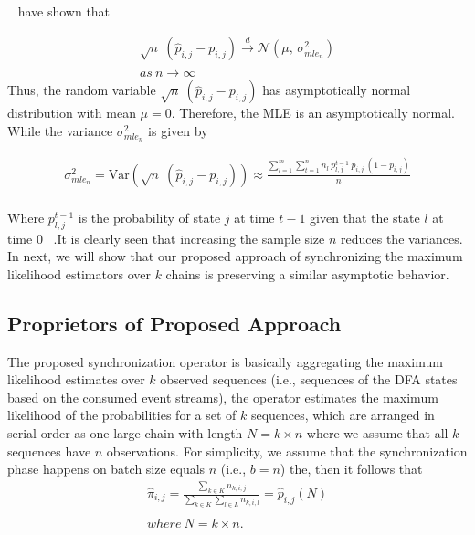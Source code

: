 	\par ~\citet{anderson1957statistical} have shown that 
	
	

	\begin{equation}
	\begin{aligned}
	\label{eq:lim_dist}
	 \sqrt{n}\ (\hat{p}_{i,j} - {p}_{i,j}) \xrightarrow{d} \mathcal{N}(\mu,\,\sigma^{2}_{mle_n})\\
	 as\ n \xrightarrow{} \infty
	 \end{aligned}
	\end{equation}
Thus, the random variable $\sqrt{n}\ (\hat{p}_{i,j} - {p}_{i,j})$ has asymptotically normal distribution with mean $\mu=0$. Therefore, the MLE is an asymptotically normal. While the variance  $\sigma^{2}_{mle_n}$ is given by   

	\begin{equation}
\begin{aligned}
\sigma^{2}_{mle_n}=\mathrm{Var}(\sqrt{n}\ (\hat{p}_{i,j} - {p}_{i,j})) \approx \frac {\sum_{l=1}^{m} \sum_{t=1}^{n} n_{l}\ p_{l,j}^{t-1} \ {p}_{i,j}\ (1- {p}_{i,j})} {n} \\
\end{aligned}
\end{equation}

Where $p_{l,j}^{t-1}$ is the probability of state $j$ at time  $t-1$ given that the state $l$ at time $0$  ~\cite{anderson1957statistical}.It is clearly seen that increasing the sample size $n$ reduces the variances.  In next, we will show that our proposed approach of synchronizing the maximum likelihood estimators over $k$ chains is preserving  a similar asymptotic behavior. 


\subsection{Proprietors of Proposed Approach}
\par The proposed synchronization operator is basically aggregating the maximum likelihood estimates over $k$ observed sequences (i.e., sequences of the DFA states based on the consumed event streams), the operator estimates the maximum likelihood of the probabilities for a set of $k$ sequences, which are arranged in serial order as one large chain with length $ N=k \times n$ where we assume that all $k$ sequences have $n$ observations. For simplicity, we assume that the synchronization phase happens on batch size equals $n$ (i.e., $b=n$) the, then it follows that 
\begin{equation}
\label{eq:dis_pi_estim2}
	\begin{aligned}
\hat{\pi}_{i,j}=\frac{\sum_{k \in K} n_{k,i,j}}{\sum_{k \in K} \sum_{l \in L} n_{k,i,l}} = \hat{p}_{i,j}(N)\\\\
 where\ N = k \times n.
 \end{aligned}
\end{equation}

